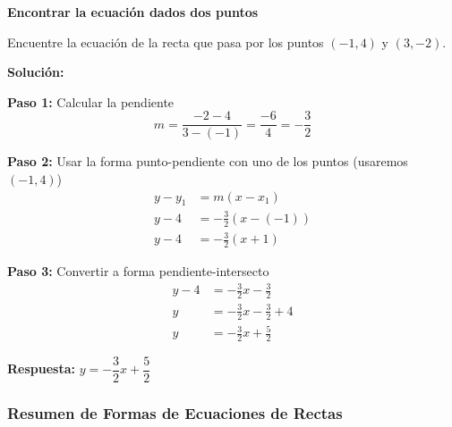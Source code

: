 \begin{example}
\textbf{Encontrar la ecuación dados dos puntos}

Encuentre la ecuación de la recta que pasa por los puntos $(-1, 4)$ y $(3, -2)$.

\textbf{Solución:}

\textbf{Paso 1:} Calcular la pendiente
$$m = \frac{-2 - 4}{3 - (-1)} = \frac{-6}{4} = -\frac{3}{2}$$

\textbf{Paso 2:} Usar la forma punto-pendiente con uno de los puntos (usaremos $(-1, 4)$)
\begin{align*}
y - y_1 &= m(x - x_1) \\
y - 4 &= -\frac{3}{2}(x - (-1)) \\
y - 4 &= -\frac{3}{2}(x + 1)
\end{align*}

\textbf{Paso 3:} Convertir a forma pendiente-intersecto
\begin{align*}
y - 4 &= -\frac{3}{2}x - \frac{3}{2} \\
y &= -\frac{3}{2}x - \frac{3}{2} + 4 \\
y &= -\frac{3}{2}x + \frac{5}{2}
\end{align*}

\textbf{Respuesta:} $y = -\dfrac{3}{2}x + \dfrac{5}{2}$
\end{example}

\newpage

\subsubsection*{Resumen de Formas de Ecuaciones de Rectas}

